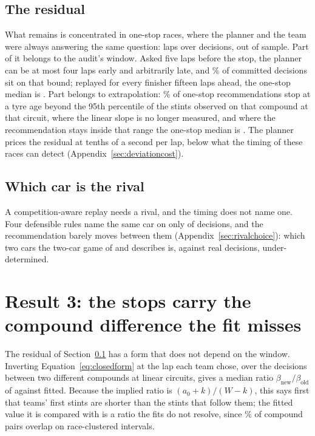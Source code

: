 \documentclass[11pt,a4paper]{article}
\begin{document}
\subsection{The residual}
\label{sec:residual}

What remains is concentrated in one-stop races, where the planner and the team
were always answering the same question: \CommitOneAfter{} laps
\CommitOneCi{} over \NCommitOne{} decisions, \OosOneMedian{} \OosOneCi{} out of
sample. Part of it belongs to the audit's window. Asked five laps before the
stop, the planner can be at most four laps early and arbitrarily late, and
\DesignTopFiveBound{}\% of committed decisions sit on that bound; replayed for
every finisher fifteen laps ahead, the one-stop median is
\DesignAllFifteenOneMedian{} \DesignAllFifteenOneCi{}. Part belongs to
extrapolation: \ExtrapOne{}\% of one-stop recommendations stop at a tyre age
beyond the 95th percentile of the stints observed on that compound at that
circuit, where the linear slope is no longer measured, and where the
recommendation stays inside that range the one-stop median is
\ExtrapOneInsideGap{}. The planner prices the residual at tenths of a second
per lap, below what the timing of these races can detect
(Appendix~\ref{sec:deviationcost}).

\subsection{Which car is the rival}

A competition-aware replay needs a rival, and the timing does not name one.
Four defensible rules name the same car on only \NRivalAllAgree{} of
\NRivalAllApply{} decisions, and the recommendation barely moves between them
(Appendix~\ref{sec:rivalchoice}): which two cars the two-car game of
\citet{aguad2024} and \citet{salminen2026} describes is, against real
decisions, under-determined.

\section{Result 3: the stops carry the compound difference the fit misses}
\label{sec:implied}

The residual of Section~\ref{sec:residual} has a form that does not depend on
the window. Inverting
Equation~\ref{eq:closedform} at the lap each team chose, over the \ImpliedN{}
decisions between two different compounds at linear circuits, gives a median
ratio $\beta_{\mathrm{new}}/\beta_{\mathrm{old}}$ of \ImpliedRatio{}
\ImpliedRatioCi{} against \ImpliedFitted{} fitted. Because the implied ratio is
$(a_0+k)/(W-k)$, this says first that teams' first stints are shorter than the
stints that follow them; the fitted value it is compared with is a ratio the
fits do not resolve, since \PctCompoundOverlapRace{}\% of compound pairs overlap
on race-clustered intervals.
\end{document}
